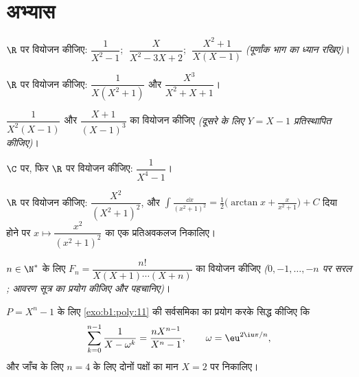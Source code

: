 \section{अभ्यास}

\begin{exercise}[$\star$]\label{exo:b1:fractions:1}
$\R$ पर वियोजन कीजिए: $\dfrac{1}{X^2 - 1}$; $\;\dfrac{X}{X^2 - 3X + 2}$;
$\;\dfrac{X^2 + 1}{X(X-1)}$ \emph{(पूर्णांक भाग का ध्यान रखिए)}।
\end{exercise}

\begin{exercise}[$\star$]\label{exo:b1:fractions:2}
$\R$ पर वियोजन कीजिए: $\dfrac{1}{X(X^2 + 1)}$ और $\dfrac{X^3}{X^2 + X + 1}$।
\end{exercise}

\begin{exercise}[$\star$]\label{exo:b1:fractions:3}
$\dfrac{1}{X^2(X - 1)}$ और $\dfrac{X + 1}{(X - 1)^3}$ का वियोजन कीजिए
\emph{(दूसरे के लिए $Y = X - 1$ प्रतिस्थापित कीजिए)}।
\end{exercise}

\begin{exercise}[$\star\star$]\label{exo:b1:fractions:4}
$\C$ पर, फिर $\R$ पर वियोजन कीजिए: $\dfrac{1}{X^4 - 1}$।
\end{exercise}

\begin{exercise}[$\star\star$]\label{exo:b1:fractions:5}
$\R$ पर वियोजन कीजिए: $\dfrac{X^2}{(X^2 + 1)^2}$, और $\int \frac{\dd
x}{(x^2+1)^2} = \frac12\bigl(\arctan x + \frac{x}{x^2+1}\bigr) + C$ दिया
होने पर $x \mapsto \dfrac{x^2}{(x^2+1)^2}$ का एक प्रतिअवकलज निकालिए।
\end{exercise}

\begin{exercise}[$\star\star$]\label{exo:b1:fractions:6}
$n \in \N^*$ के लिए $F_n = \dfrac{n!}{X(X+1)\cdots(X+n)}$ का वियोजन कीजिए
\emph{($0, -1, \dots, -n$ पर सरल ; आवरण सूत्र का प्रयोग कीजिए और  पहचानिए)}।
\end{exercise}

\begin{exercise}[$\star\star$]\label{exo:b1:fractions:7}
$P = X^n - 1$ के लिए \cref{exo:b1:poly:11} की सर्वसमिका का प्रयोग करके सिद्ध
कीजिए कि
\[
\sum_{k=0}^{n-1} \frac{1}{X - \omega^k} = \frac{n X^{n-1}}{X^n - 1},
\qquad \omega = \eu^{2\iu\pi/n},
\]
और जाँच के लिए $n = 4$ के लिए दोनों पक्षों का मान $X = 2$ पर निकालिए।
\end{exercise}

